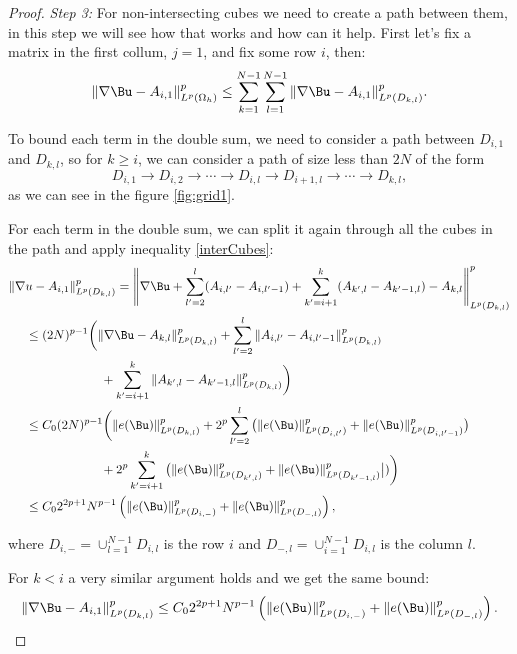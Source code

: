 \begin{proof}
\textit{Step 3:} For non-intersecting cubes we need to create a path between them, in this step we will see how that works and how can it help.
First let's fix a matrix in the first collum, $j=1$, and fix some row $i$, then:
\begin{equation*}
    \|\nabla \Bu- A_{i,1}\|^p_{L^p(\Omega_h)} \leq \sum_{k=1}^{N-1}\sum_{l=1}^{N-1}\|\nabla \Bu- A_{i,1}\|^p_{L^p(D_{k,l})}.
\end{equation*}
    
To bound each term in the double sum, we need to consider a path between $D_{i,1}$ and $D_{k,l}$, so for $k\geq i$, we can consider a path of size less than $2N$ of the form
    $$D_{i,1}\to D_{i,2}\to\cdots\to D_{i,l}\to D_{i+1,l}\to\cdots\to D_{k,l},$$
as we can see in the figure \ref{fig:grid1}.

    

For each term in the double sum, we can split it again through all the cubes in the path and apply inequality \ref{interCubes}: 
    \begin{align*}
    \|\nabla &u- A_{i,1}\|^p_{L^p(D_{k,l})} = \left\|\nabla \Bu+ \sum_{l'=2}^l (A_{i,l'}-A_{i, l'-1})+\sum_{k'=i+1}^k (A_{k',l}-A_{k'-1, l}) -A_{k,l}\right\|^p_{L^p(D_{k,l})}
    \\
    &\leq (2N)^{p-1}\bigg(\|\nabla \Bu-A_{k,l}\|^p_{L^p(D_{k,l})} + \sum_{l'=2}^l \|A_{i,l'}-A_{i, l'-1}\|^p_{L^p(D_{k,l})}\\
    &\qquad\qquad\qquad+\sum_{k'=i+1}^k \|A_{k',l}-A_{k'-1, l}\|^p_{L^p(D_{k,l})}\bigg)\\
    &\leq C_0(2N)^{p-1}\bigg(\|e(\Bu)\|^p_{L^p(D_{k,l})} + 2^p \sum_{l'=2}^l \big(\|e(\Bu)\|^p_{L^p(D_{i,l'})}+\|e(\Bu)\|^p_{L^p(D_{i,l'-1})}\big)\\
    &\qquad\qquad\qquad+2^p\sum_{k'=i+1}^k\big(\|e(\Bu)\|^p_{L^p(D_{k',l})}+\|e(\Bu)\|^p_{L^p(D_{k'-1,l})}\big|)\bigg)\\
    &\leq C_0 2^{2p+1}  N^{p-1}\left(\|e(\Bu)\|^p_{L^p(D_{i,-})}+\|e(\Bu)\|^p_{L^p(D_{-,l})}\right),
    \end{align*}
    
    where $D_{i,-}=\cup_{l=1}^{N-1} D_{i,l}$ is the row $i$ and $D_{-,l}=\cup_{i=1}^{N-1} D_{i,l}$ is the column $l$. 
    
    For $k<i$  a very similar argument holds and we get the same bound:
    $$\|\nabla \Bu- A_{i,1}\|^p_{L^p(D_{k,l})}\leq C_0 2^{2p+1}  N^{p-1} \left(\|e(\Bu)\|^p_{L^p(D_{i,-})}+\|e(\Bu)\|^p_{L^p(D_{-,l})}\right).$$
    

\end{proof}
